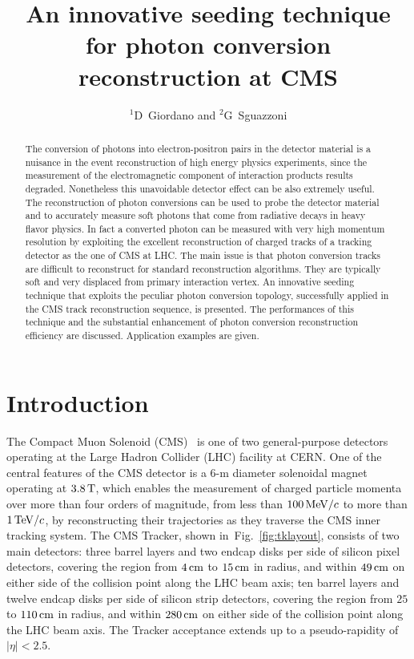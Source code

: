 \documentclass[a4paper]{jpconf}
\begin{document}
\title{An innovative seeding technique for photon conversion reconstruction at CMS}

\author{$^1$D~Giordano and $^2$G~Sguazzoni}

\address{$^1$CERN, Information Technology Department, Experiment Support Group, Geneva, Switzerland}
\address{$^2$INFN, Firenze, Italy}



\begin{abstract}
The conversion of photons into electron-positron pairs in the detector material is a nuisance in the event reconstruction of high energy physics experiments, since the measurement of the electromagnetic component of interaction products results degraded. Nonetheless this unavoidable detector effect can be also extremely useful. The reconstruction of photon conversions can be used to probe the detector material and to accurately measure soft photons that come from radiative decays in heavy flavor physics. In fact a converted photon can be measured with very high momentum resolution by exploiting the excellent reconstruction of charged tracks of a tracking detector as the one of CMS at LHC. The main issue is that photon conversion tracks are difficult to reconstruct for standard reconstruction algorithms. They are typically soft and very displaced from primary interaction vertex. An innovative seeding technique that exploits the peculiar photon conversion topology, successfully applied in the CMS track reconstruction sequence, is presented. The performances of this technique and the substantial enhancement of photon conversion reconstruction efficiency are discussed. Application examples are given.
\end{abstract}


\section{Introduction}
\label{introductions}

The Compact Muon Solenoid (CMS)~\cite{JINST} is one of two general-purpose
detectors operating at the Large Hadron Collider (LHC) facility at CERN.
One of the central features of the CMS detector is a $6$-m diameter solenoidal
magnet operating at $3.8\,{\rm T}$, which enables the measurement of charged
particle momenta over more than four orders of magnitude, from less than
$100{\rm \, MeV}/c$ to more than $1{\rm \, TeV}/c$, by reconstructing their trajectories as they
traverse the CMS inner tracking system. The CMS Tracker, shown
in~Fig.~\ref{fig:tklayout}, consists of two main detectors: three
barrel layers and two endcap disks per side of silicon pixel detectors, covering
the region from $4\rm \, cm$ to $15\rm \, cm$ in radius, and within $49\rm \, cm$ on either
side of the collision point along the LHC beam axis; ten barrel layers and
twelve endcap disks per side of silicon strip detectors, covering the
region from $25$ to $110\rm \, cm$ in radius, and within $280\rm \, cm$ on either
side of the collision point along the LHC beam axis. The Tracker
acceptance extends up to a pseudo-rapidity of $\left | \eta \right | < 2.5$.
\end{document}
